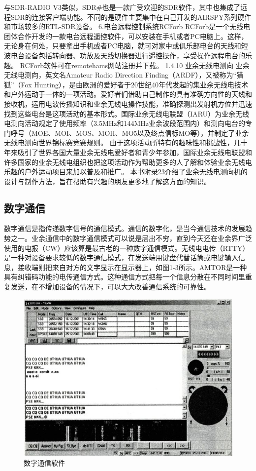 \documentclass[12pt,UTF8]{ctexbook}
\begin{document}
与SDR-RADIO V3类似，SDR\#也是一款广受欢迎的SDR软件，其中也集成了远程SDR的连接客户端功能。不同的是硬件主要集中在自己开发的AIRSPY系列硬件和市场较多的RTL-SDR设备。
6.电台远程控制系统RCForb
RCForb是一个无线电团体合作开发的一款电台远程遥控软件，可以安装在手机或者PC电脑上。这样，无论身在何处，只要拿出手机或者PC电脑，就可对家中或俱乐部电台的天线和短波电台设备包括转向器、功放及天线切换器进行遥控操作，享受操作远程电台的乐趣。
RCForb软件可在remotehams网站注册并下载。
1.4.10 业余无线电测向
业余无线电测向，英文名Amateur Radio Direction Finding（ARDF），又被称为“猎狐”（Fox Hunting），是由欧洲的爱好者于20世纪40年代发起的集业余无线电技术和户外运动于一体的一项活动。爱好者们借助自己制作的具有准确方向性的天线和接收机，运用电波传播知识和业余无线电操作技能，准确探测出发射机方位并迅速找到这些电台是这项活动的基本形式。国际业余无线电联盟（IARU）为业余无线电测向活动规定了使用频率（3.5MHz和144MHz业余波段范围内）和测向电台的专门呼号（MOE、MOI、MOS、MOH、MO5以及终点信标MO等），并制定了业余无线电测向世界锦标赛竞赛规则。
由于这项活动所特有的趣味性和挑战性，几十年来吸引了世界各国大量业余无线电爱好者和青少年参加，国际业余无线电联盟和许多国家的业余无线电组织也把这项活动作为帮助更多的人了解和体验业余无线电乐趣的户外运动项目来加以普及和推广。
本书附录23介绍了业余无线电测向机的设计与制作方法，旨在帮助有兴趣的朋友更多地了解这方面的知识。

\subsection{数字通信}

数字通信是指传递数字信号的通信模式。通信的数字化，是当今通信技术的发展趋势之一。业余通信中的数字通信模式可以说是层出不穷，直到今天还在业余界广泛使用的电报（CW）应该算是最古老的一种数字通信模式。无线电电传（RTTY）是一种对设备要求较低的数字通信模式，在发送端用键盘代替话筒或电键输入信息，接收端则把来自对方的文字显示在显示器上，如图1-3所示。AMTOR是一种具有纠错码功能的电传通信方式。这种通信方式把每一个信息分散在不同时间里重复发送，在不增加设备的情况下，可以大大改善通信系统的可靠性。

\begin{figure}[htbp]
	\centering
	\includegraphics[width=0.7\linewidth]{3}
	\caption{数字通信软件}
	\label{fig:1}
\end{figure}
\end{document}

